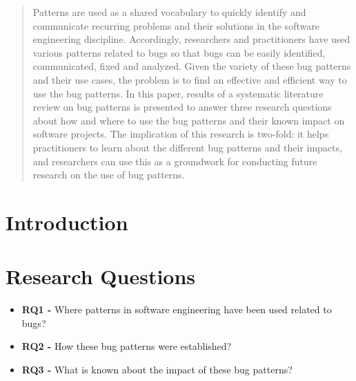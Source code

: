 \documentclass[conference]{IEEEtran}
\begin{document}
\begin{abstract}
Patterns are used as a shared vocabulary to quickly identify and communicate recurring problems and their solutions in the software engineering discipline. Accordingly, researchers and practitioners have used various patterns related to bugs so that bugs can be easily identified, communicated, fixed and analyzed. Given the variety of these bug patterns and their use cases, the problem is to find an effective and efficient way to use the bug patterns. In this paper, results of a systematic literature review on bug patterns is presented to answer three research questions about how and where to use the bug patterns and their known impact on software projects. The implication of this research is two-fold: it helps practitioners to learn about the different bug patterns and their impacts, and researchers can use this as a groundwork for conducting future research on the use of bug patterns.

\end{abstract}





%
\IEEEpeerreviewmaketitle


\section{Introduction}

\section{Research Questions}

\begin{itemize}
  \item \textbf{RQ1 - } Where patterns in software engineering have been used related to bugs?
  \item \textbf{RQ2 - } How these bug patterns were established?
  \item \textbf{RQ3 - } What is known about the impact of these bug patterns?
\end{itemize}
\end{document}
